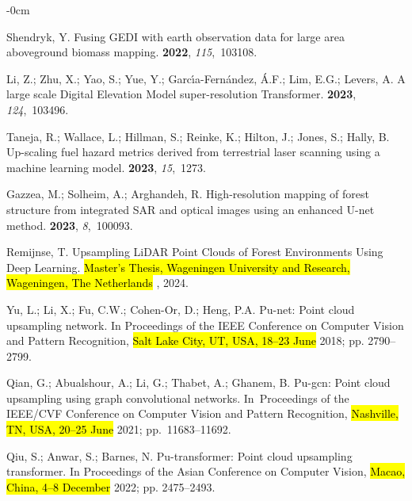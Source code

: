 \documentclass[remotesensing,article,accept,pdftex,moreauthors]{Definitions/mdpi}
\begin{document}
\begin{adjustwidth}{-\extralength}{0cm}
\begin{thebibliography}{999}
Shendryk, Y.
\newblock Fusing GEDI with earth observation data for large area aboveground
  biomass mapping.
 {\bf 2022}, {\em 115},~103108.

Li, Z.; Zhu, X.; Yao, S.; Yue, Y.; Garc{\'\i}a-Fern{\'a}ndez, {\'A}.F.; Lim,
  E.G.; Levers, A.
\newblock A large scale Digital Elevation Model super-resolution Transformer.
 {\bf 2023}, {\em 124},~103496.

Taneja, R.; Wallace, L.; Hillman, S.; Reinke, K.; Hilton, J.; Jones, S.; Hally,
  B.
\newblock Up-scaling fuel hazard metrics derived from terrestrial laser
  scanning using a machine learning model.
 {\bf 2023}, {\em 15},~1273.

Gazzea, M.; Solheim, A.; Arghandeh, R.
\newblock High-resolution mapping of forest structure from integrated SAR and
  optical images using an enhanced U-net method.
 {\bf 2023}, {\em 8},~100093.

Remijnse, T.
\newblock Upsampling LiDAR Point Clouds of Forest Environments Using Deep Learning. \hl{Master's Thesis, Wageningen University and Research, Wageningen, The Netherlands}%
, 2024.

Yu, L.; Li, X.; Fu, C.W.; Cohen-Or, D.; Heng, P.A.
\newblock Pu-net: Point cloud upsampling network.
\newblock In Proceedings of the IEEE Conference on Computer
  Vision and Pattern Recognition, \hl{Salt Lake City, UT, USA, 18--23 June} 2018; pp. 2790--2799.

Qian, G.; Abualshour, A.; Li, G.; Thabet, A.; Ghanem, B.
\newblock Pu-gcn: Point cloud upsampling using graph convolutional networks.
\newblock In~Proceedings of the IEEE/CVF Conference on
  Computer Vision and Pattern Recognition, \hl{Nashville, TN, USA, 20--25 June} 2021; \mbox{pp. 11683--11692}.

Qiu, S.; Anwar, S.; Barnes, N.
\newblock Pu-transformer: Point cloud upsampling transformer.
\newblock In Proceedings of the Asian Conference on Computer
  Vision, \hl{Macao, China, 4--8 December} 2022; pp. 2475--2493.


\end{thebibliography}
\end{adjustwidth}
\end{document}
